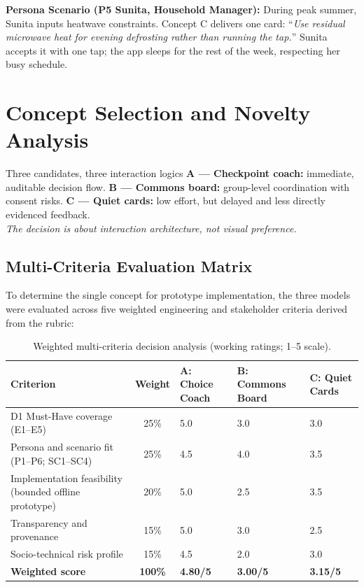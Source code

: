 \documentclass[12pt,a4paper]{article}
\begin{document}
\textbf{Persona Scenario (P5 Sunita, Household Manager):} During peak summer, Sunita inputs heatwave constraints. Concept C delivers one card: ``\emph{Use residual microwave heat for evening defrosting rather than running the tap.}'' Sunita accepts it with one tap; the app sleeps for the rest of the week, respecting her busy schedule.

\section{Concept Selection and Novelty Analysis}

\begin{chapterfocus}{Three candidates, three interaction logics}
\textbf{A --- Checkpoint coach:} immediate, auditable decision flow. \quad
\textbf{B --- Commons board:} group-level coordination with consent risks. \quad
\textbf{C --- Quiet cards:} low effort, but delayed and less directly evidenced feedback.\\[0.3em]
\textit{The decision is about interaction architecture, not visual preference.}
\end{chapterfocus}

\subsection{Multi-Criteria Evaluation Matrix}
To determine the single concept for prototype implementation, the three models were evaluated across five weighted engineering and stakeholder criteria derived from the rubric:

\begin{table}[ht]
\centering
\small
\caption{Weighted multi-criteria decision analysis (working ratings; 1--5 scale).}
\label{tab:mcdm}
\begin{tabularx}{\textwidth}{@{}p{3.0cm}cXXX@{}}
\toprule
\textbf{Criterion} & \textbf{Weight} & \textbf{A: Choice Coach} & \textbf{B: Commons Board} & \textbf{C: Quiet Cards}\\
\midrule
D1 Must-Have coverage (E1--E5) & 25\% & 5.0 & 3.0 & 3.0\\
Persona and scenario fit (P1--P6; SC1--SC4) & 25\% & 4.5 & 4.0 & 3.5\\
Implementation feasibility (bounded offline prototype) & 20\% & 5.0 & 2.5 & 3.5\\
Transparency and provenance & 15\% & 5.0 & 3.0 & 2.5\\
Socio-technical risk profile & 15\% & 4.5 & 2.0 & 3.0\\
\midrule
\textbf{Weighted score} & \textbf{100\%} & \textbf{4.80/5} & \textbf{3.00/5} & \textbf{3.15/5}\\
\bottomrule
\end{tabularx}
\end{table}
\end{document}
